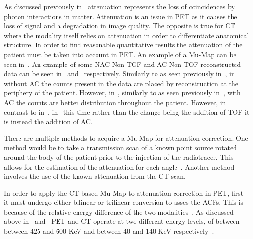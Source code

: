                 As discussed previously in~ attenuation represents the loss of coincidences by photon interactions in matter. Attenuation is an issue in \gls{PET} as it causes the loss of signal and a degradation in image quality. The opposite is true for \gls{CT} where the modality itself relies on attenuation in order to differentiate anatomical structure. In order to find reasonable quantitative results the attenuation of the patient must be taken into account in \gls{PET}. %
                An example of a \gls{Mu-Map} can be seen in~. An example of some \gls{NAC} \gls{Non-TOF} and \gls{AC} \gls{Non-TOF} reconstructed data can be seen in~ and~ respectively. Similarly to as seen previously in~, in~ without \gls{AC} the counts present in the data are placed by reconstruction at the periphery of the patient. However, in~, similarly to as seen previously in~, with \gls{AC} the counts are better distribution throughout the patient. However, in contrast to in~, in~ this time rather than the change being the addition of \gls{TOF} it is instead the addition of \gls{AC}.
                
                There are multiple methods to acquire a \gls{Mu-Map} for attenuation correction. One method would be to take a transmission scan of a known point source rotated around the body of the patient prior to the injection of the radiotracer. This allows for the estimation of the attenuation for each angle~\parencite{TransmissionatnBib}. Another method involves the use of the known attenuation from the \gls{CT} scan.
                
                In order to apply the \gls{CT} based \gls{Mu-Map} to attenuation correction in \gls{PET}, first it must undergo either bilinear or trilinear conversion to asses the \glspl{ACF}. This is because of the relative energy difference of the two modalities~\parencite{Carney2006}. As discussed above in~ and~ \gls{PET} and \gls{CT} operate at two different energy levels, of between between $425$ and $600$ \gls{KeV} and between $40$ and $140$ \gls{KeV} respectively~\parencite{Bettinardi2011, CTattenuationenergyBib}.
                
